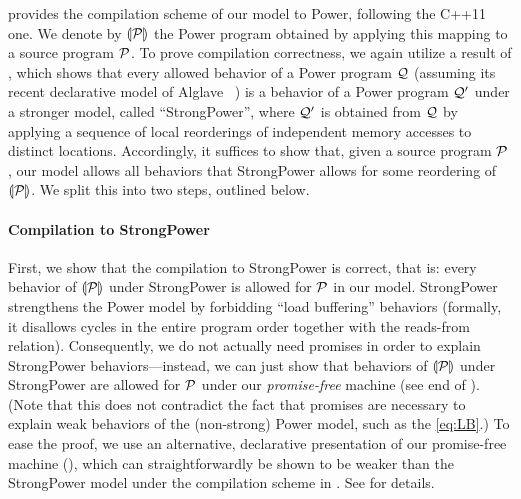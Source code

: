  provides the compilation scheme of our model to Power, following the C++11 one.
We denote by ${\llparenthesis{\mathcal{P}}\rrparenthesis}$ the Power program obtained by applying this mapping to a source program $\mathcal{P}$.
To prove compilation correctness, we again utilize a result of \cite{fm16},
which shows that every allowed behavior of a Power program $\mathcal{Q}$  
(assuming its recent declarative model of Alglave \etal~\cite{herding-cats})
is a behavior of a Power program $\mathcal{Q}'$ under a stronger model, called ``StrongPower'',
where $\mathcal{Q}'$ is obtained from $\mathcal{Q}$ by applying a sequence of local reorderings of independent memory accesses to distinct locations.
Accordingly, it suffices to show that, given a source program $\mathcal{P}$, our model allows all behaviors 
that StrongPower allows for some reordering of ${\llparenthesis{\mathcal{P}}\rrparenthesis}$.
We split this into two steps, outlined below.

\paragraph{Compilation to StrongPower}
First, we show that the compilation to StrongPower is correct, that is: every behavior of ${\llparenthesis{\mathcal{P}}\rrparenthesis}$ under StrongPower is allowed for $\mathcal{P}$ in our model.
StrongPower strengthens the Power model by forbidding ``load buffering'' behaviors
(formally, it disallows cycles in the entire program order together with the reads-from relation).
Consequently, we do not actually need promises in order to explain
StrongPower behaviors---instead, we can just show that behaviors of ${\llparenthesis{\mathcal{P}}\rrparenthesis}$
under StrongPower are allowed for $\mathcal{P}$ under our \emph{promise-free} machine (see end of ).
(Note that this does not contradict the fact that
promises are necessary to explain weak behaviors of the (non-strong) Power model, such as the \ref{eq:LB}.) 
To ease the proof, we use an alternative, declarative presentation of our promise-free machine
(),
which can straightforwardly be shown to be weaker than
the StrongPower model under the compilation scheme in .
See \cite{appendix} for details.


